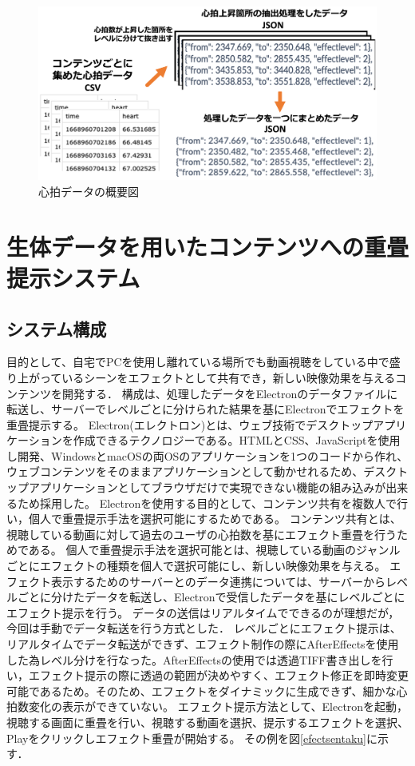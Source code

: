 \begin{figure}[H]
    \centering
    \includegraphics[width=16cm]{images/chapter3/system.png}
    \caption{心拍データの概要図}
    \label{gaiyou}
\end{figure}







\section{生体データを用いたコンテンツへの重畳提示システム}
 
\subsection{システム構成}
目的として、自宅でPCを使用し離れている場所でも動画視聴をしている中で盛り上がっているシーンをエフェクトとして共有でき，新しい映像効果を与えるコンテンツを開発する．
構成は、処理したデータをElectronのデータファイルに転送し、サーバーでレベルごとに分けられた結果を基にElectronでエフェクトを重畳提示する。
Electron(エレクトロン)とは、ウェブ技術でデスクトップアプリケーションを作成できるテクノロジーである。HTMLとCSS、JavaScriptを使用し開発、WindowsとmacOSの両OSのアプリケーションを1つのコードから作れ、ウェブコンテンツをそのままアプリケーションとして動かせれるため、デスクトップアプリケーションとしてブラウザだけで実現できない機能の組み込みが出来るため採用した。
Electronを使用する目的として、コンテンツ共有を複数人で行い，個人で重畳提示手法を選択可能にするためである。
コンテンツ共有とは、視聴している動画に対して過去のユーザの心拍数を基にエフェクト重畳を行うためである。
個人で重畳提示手法を選択可能とは、視聴している動画のジャンルごとにエフェクトの種類を個人で選択可能にし、新しい映像効果を与える。
エフェクト表示するためのサーバーとのデータ連携については、サーバーからレベルごとに分けたデータを転送し、Electronで受信したデータを基にレベルごとにエフェクト提示を行う。
データの送信はリアルタイムでできるのが理想だが，今回は手動でデータ転送を行う方式とした．
レベルごとにエフェクト提示は、リアルタイムでデータ転送ができず、エフェクト制作の際にAfterEffectsを使用した為レベル分けを行なった。AfterEffectsの使用では透過TIFF書き出しを行い，エフェクト提示の際に透過の範囲が決めやすく、エフェクト修正を即時変更可能であるため。そのため、エフェクトをダイナミックに生成できず、細かな心拍数変化の表示ができていない。
エフェクト提示方法として、Electronを起動，視聴する画面に重畳を行い、視聴する動画を選択、提示するエフェクトを選択、Playをクリックしエフェクト重畳が開始する。
その例を図\ref{efectsentaku}に示す．
 
